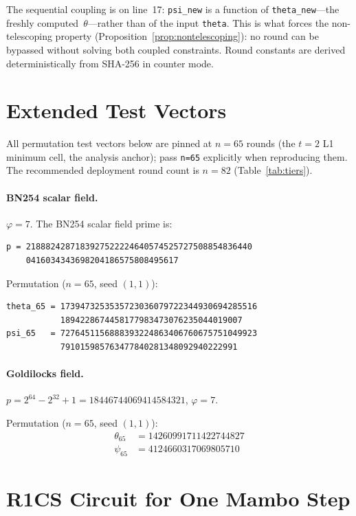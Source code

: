 \documentclass[11pt,a4paper]{article}
\theoremstyle{definition}
\begin{document}
The sequential coupling is on line~17: \texttt{psi\_new} is a function of
\texttt{theta\_new}---the freshly computed~$\theta$---rather than of the input
\texttt{theta}. This is what forces the non-telescoping property
(Proposition~\ref{prop:nontelescoping}):
no round can be bypassed without solving both coupled constraints. Round constants are derived deterministically from
SHA-256 in counter mode.


\section{Extended Test Vectors}\label{app:testvectors}

All permutation test vectors below are pinned at $n = 65$ rounds (the
$t=2$ L1 minimum cell, the analysis anchor); pass \texttt{n=65}
explicitly when reproducing them. The recommended deployment round
count is $n = 82$ (Table~\ref{tab:tiers}).

\paragraph{BN254 scalar field.}
$\varphi = 7$. The BN254 scalar field prime is:

{\small
\begin{verbatim}
p = 2188824287183927522224640574525727508854836440
    0416034343698204186575808495617
\end{verbatim}
}

\noindent Permutation ($n = 65$, seed $(1, 1)$):

{\small
\begin{verbatim}
theta_65 = 1739473253535723036079722344930694285516
           1894228674458177983473076235044019007
psi_65   = 7276451156888393224863406760675751049923
           791015985763477840281348092940222991
\end{verbatim}
}

\paragraph{Goldilocks field.}
$p = 2^{64} - 2^{32} + 1 = 18446744069414584321$,
$\varphi = 7$.

\noindent Permutation ($n = 65$, seed $(1, 1)$):
\begin{align*}
\theta_{65} &= 14260991711422744827 \\
\psi_{65}   &= 4124660317069805710
\end{align*}


\section{R1CS Circuit for One Mambo Step}\label{app:r1cs}
\end{document}
